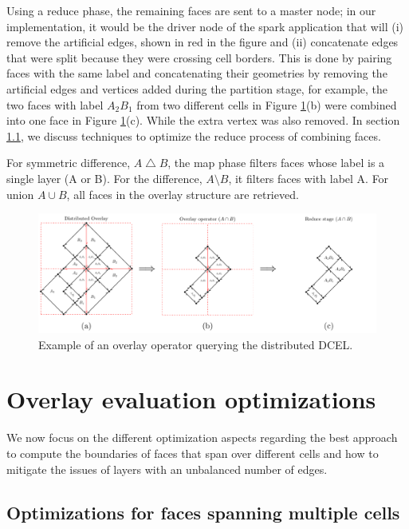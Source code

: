 Using a reduce phase, the remaining faces are sent to a master node; in our implementation, it would be the driver node of the spark application that will (i) remove the artificial edges, shown in red in the figure and (ii) concatenate edges that were split because they were crossing cell borders. This is done by pairing faces with the same label and concatenating their geometries by removing the artificial edges and vertices added during the partition stage, for example, the two faces with label $A_2B_1$ from two different cells in Figure \ref{fig:overlay_operator}(b) were combined into one face in Figure \ref{fig:overlay_operator}(c). While the extra vertex was also removed. In section \ref{sec:optimizing}, we discuss techniques to optimize the reduce process of combining faces.

For symmetric difference, $A \bigtriangleup B$, the map phase filters faces whose label is a single layer (A or B). For the difference, $A \setminus B$, it 
filters faces with label A. For union $A \cup B$, all faces in the overlay structure are retrieved. 

\begin{figure}
    \centering
    \includegraphics[width=\linewidth]{chapterSDCEL/overlay_operator.pdf}    
    \caption{Example of an overlay operator querying the distributed DCEL.} \label{fig:overlay_operator}
\end{figure}

\section{Overlay evaluation optimizations}\label{sec:alternative_methods}
We now focus on the different optimization aspects regarding the best approach to compute the boundaries of faces that span over different cells and how to mitigate the issues of layers with an unbalanced number of edges.

\subsection{Optimizations for faces spanning multiple cells}\label{sec:optimizing}

